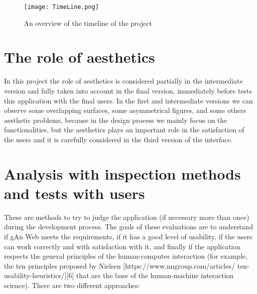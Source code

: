 \begin{figure}[H]
\centering
\texttt{[image: TimeLine.png]} 
\caption{An overview of the timeline of the project}
\end{figure}


\section{The role of aesthetics} 
In this project the role of aesthetics is considered partially in the intermediate version and fully taken into account in the final version, immediately before tests this application with the final users.
In the first and intermediate versions we can observe some overlapping surfaces, some asymmetrical figures, and some others aesthetic problems, because in the design process we mainly focus on the functionalities, but the aesthetics plays an important role in the satisfaction of the users and it is carefully considered in the third version of the interface.  

\section{Analysis with inspection methods and tests with users}
These are methods to try to judge the application (if necessary more than once) during the development process. 
The goals of these evaluations are to understand if gAn Web meets the requirements, if it has a good level of usability, if the users can work correctly and with satisfaction with it, and finally if the application respects the general principles of the human-computer interaction (for example, the ten principles proposed by Nielsen [https://www.nngroup.com/articles/
ten-usability-heuristics/][6] that are the base of the human-machine interaction science).
There are two different approaches:


